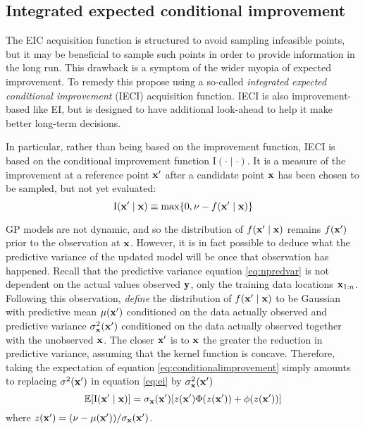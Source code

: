 \subsection{Integrated expected conditional improvement}

The EIC acquisition function is structured to avoid sampling infeasible points, but it may be beneficial to sample such points in order to provide information in the long run. This drawback is a symptom of the wider myopia of expected improvement. To remedy this \citet{gramacy2011optimization} propose using a so-called \textit{integrated expected conditional improvement} (IECI) acquisition function. IECI is also improvement-based like EI, but is designed to have additional look-ahead to help it make better long-term decisions. 

In particular, rather than being based on the improvement function, IECI is based on the conditional improvement function $\mathrm{I}(\cdot\mid\cdot)$. It is a measure of the improvement at a reference point $\mathbf{x}'$ after a candidate point $\mathbf{x}$ has been chosen to be sampled, but not yet evaluated:
%
\begin{equation} \label{eq:conditionalimprovement}
\mathrm{I}(\mathbf{x}' \mid \mathbf{x}) \equiv \max \{0, \nu - f(\mathbf{x}' \mid \mathbf{x})\}
\end{equation}

GP models are not dynamic, and so the distribution of $f(\mathbf{x}' \mid \mathbf{x})$ remains $f(\mathbf{x}')$ prior to the observation at $\mathbf{x}$. However, it is in fact possible to deduce what the predictive variance of the updated model will be once that observation has happened. Recall that the predictive variance equation \ref{eq:npredvar} is not dependent on the actual values observed $\mathbf{y}$, only the training data locations $\mathbf{x}_{1:n}$. Following this observation, \citet{gramacy2011optimization} \textit{define} the distribution of $f(\mathbf{x}' \mid \mathbf{x})$ to be Gaussian with predictive mean $\mu(\mathbf{x}')$ conditioned on the data actually observed and predictive variance $\sigma^2_{\mathbf{x}}(\mathbf{x}')$ conditioned on the data actually observed together with the unobserved $\mathbf{x}$. The closer $\mathbf{x}'$ is to $\mathbf{x}$ the greater the reduction in predictive variance, assuming that the kernel function is concave. Therefore, taking the expectation of equation \ref{eq:conditionalimprovement} simply amounts to replacing $\sigma^2(\mathbf{x}')$ in equation \ref{eq:ei} by $\sigma^2_{\mathbf{x}}(\mathbf{x}')$
%
\begin{equation}
\mathbb{E}[\mathrm{I}(\mathbf{x}' \mid \mathbf{x})] = \sigma_{\mathbf{x}}(\mathbf{x}')[z(\mathbf{x}')\Phi(z(\mathbf{x}')) + \phi(z(\mathbf{x}'))] \label{eq:expectedci}
\end{equation}
%
where $z(\mathbf{x}') = {(\nu - \mu(\mathbf{x}'))}/{\sigma_{\mathbf{x}}(\mathbf{x}')}$. 

